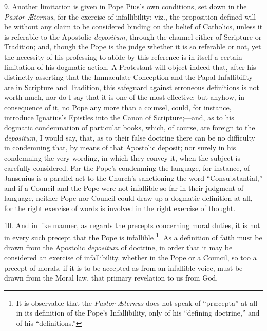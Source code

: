 9. Another limitation is given in Pope Pius's own conditions, set
down in the \emph{Pastor Æternus}, for the exercise of infallibility:
viz., the proposition defined will be without any claim to be considered
binding on the belief of Catholics, unless it is referable to the
Apostolic \emph{depositum}, through the channel either of Scripture or
Tradition; and, though the Pope is the judge whether it is so
referable or not, yet the necessity of his professing to abide by this
reference is in itself a certain limitation of his dogmatic action. A
Protestant will object indeed that, after his distinctly asserting that
the Immaculate Conception and the Papal Infallibility are in Scripture
and Tradition, this safeguard against erroneous definitions is not worth
much, nor do I say that it is one of the most effective: but anyhow, in
consequence of it, no Pope any more than a counsel, could, for instance,
introduce Ignatius's Epistles into the Canon of Scripture;—and, as to
his dogmatic condemnation of particular books, which, of course, are
foreign to the \emph{depositum}, I would say, that, as to their false
doctrine there can be no difficulty in condemning that, by means of that
Apostolic deposit; nor surely in his condemning the very wording, in
which they convey it, when the subject is carefully considered. For the
Pope's condemning the language, for instance, of Jansenius is a parallel
act to the Church's sanctioning the word ``Consubstantial,'' and
if a Council and the Pope were not infallible so far in their judgment
of language, neither Pope nor Council could draw up a dogmatic
definition at all, for the right exercise of words is involved in the
right exercise of thought.

10. And in like manner, as regards the precepts concerning moral
duties, it is not in every such precept that the Pope is infallible \footnote{It is observable that the \emph{Pastor Æternus} does not speak of
``præcepta'' at all in its definition of the Pope's
Infallibility, only of his ``defining doctrine,'' and of his
``definitions.''}. As a definition of faith must be drawn from the
Apostolic \emph{depositum} of doctrine, in order that it may be
considered an exercise of infallibility, whether in the Pope or a
Council, so too a precept of morals, if it is to be accepted as from an
infallible voice, must be drawn from the Moral law, that primary
revelation to us from God.

